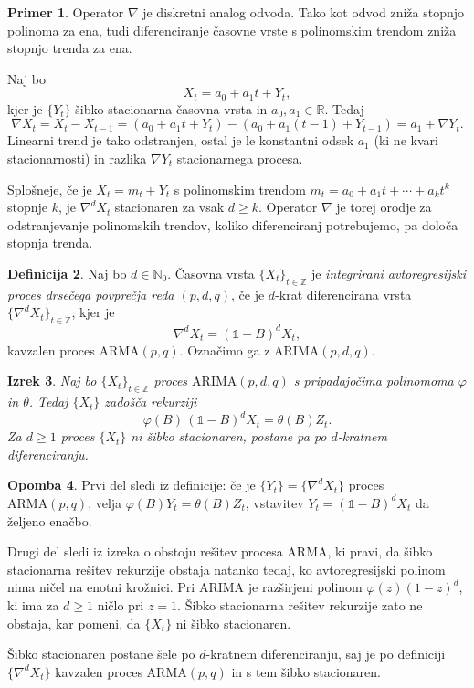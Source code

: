 \documentclass[11pt]{amsart}
\newcommand{\N}{\mathbb{N}}
\newcommand{\Z}{\mathbb{Z}}
\newcommand{\R}{\mathbb{R}}
\theoremstyle{definition}
\newtheorem{definicija}{Definicija}[section]
\newtheorem{primer}[definicija]{Primer}
\newtheorem{opomba}[definicija]{Opomba}
\theoremstyle{plain}
\newtheorem{izrek}[definicija]{Izrek}
\begin{document}
\begin{primer}
    Operator $\nabla$ je diskretni analog odvoda. Tako kot odvod zniža stopnjo polinoma za ena, 
    tudi diferenciranje časovne vrste s polinomskim trendom zniža stopnjo trenda za ena.

    Naj bo 
    \[
    X_t = a_0 + a_1 t + Y_t,
    \] kjer je $\{Y_t\}$ šibko stacionarna časovna vrsta in 
    $a_0, a_1 \in \R$. Tedaj
    \[
        \nabla X_t = X_t - X_{t-1} 
                   = (a_0 + a_1 t + Y_t) - (a_0 + a_1 (t-1) + Y_{t-1}) 
                   = a_1 + \nabla Y_t.
    \]
    Linearni trend je tako odstranjen, ostal je le konstantni odsek $a_1$ (ki ne kvari 
    stacionarnosti) in razlika $\nabla Y_t$ stacionarnega procesa.
    
    Splošneje, če je $X_t = m_t + Y_t$ s polinomskim trendom $m_t = a_0 + a_1 t + \cdots + a_k t^k$ 
    stopnje $k$, je $\nabla^d X_t$ stacionaren za vsak $d \geq k$. Operator $\nabla$ je torej 
    orodje za odstranjevanje polinomskih trendov, koliko diferenciranj potrebujemo, pa določa 
    stopnja trenda.
\end{primer}

\begin{definicija}
    Naj bo $d \in \N_0$. Časovna vrsta $\{X_t\}_{t \in \Z}$ je \emph{integrirani avtoregresijski 
    proces drsečega povprečja reda $(p,d,q)$}, če je $d$-krat diferencirana vrsta 
    $\{\nabla^d X_t\}_{t \in \Z}$, kjer je
    \[
        \nabla^d X_t = (\mathds{1} - B)^d X_t,
    \]
    kavzalen proces $\mathrm{ARMA}(p,q)$. Označimo ga z $\mathrm{ARIMA}(p,d,q)$.
\end{definicija}

\begin{izrek}
    Naj bo $\{X_t\}_{t \in \Z}$ proces $\mathrm{ARIMA}(p,d,q)$ s pripadajočima polinomoma 
    $\varphi$ in $\theta$. Tedaj $\{X_t\}$ zadošča rekurziji
    \[
        \varphi(B)\,(\mathds{1} - B)^d X_t = \theta(B) Z_t.
    \]
    Za $d \geq 1$ proces $\{X_t\}$ ni šibko stacionaren, postane pa po $d$-kratnem diferenciranju.
\end{izrek}

\begin{opomba}
    Prvi del sledi iz definicije: če je $\{Y_t\} = \{\nabla^d X_t\}$ proces 
    $\mathrm{ARMA}(p,q)$, velja $\varphi(B) Y_t = \theta(B) Z_t$, vstavitev 
    $Y_t = (\mathds{1}-B)^d X_t$ da željeno enačbo.

    Drugi del sledi iz izreka o obstoju rešitev procesa $\mathrm{ARMA}$, ki pravi, da 
    šibko stacionarna rešitev rekurzije obstaja natanko tedaj, ko avtoregresijski polinom 
    nima ničel na enotni krožnici. Pri ARIMA je razširjeni polinom $\varphi(z)(1-z)^d$, 
    ki ima za $d \geq 1$ ničlo pri $z = 1$. Šibko stacionarna rešitev rekurzije zato ne obstaja, 
    kar pomeni, da $\{X_t\}$ ni šibko stacionaren.

    Šibko stacionaren postane šele po $d$-kratnem diferenciranju, saj je po definiciji 
    $\{\nabla^d X_t\}$ kavzalen proces $\mathrm{ARMA}(p,q)$ in s tem šibko stacionaren.
\end{opomba}
\end{document}
